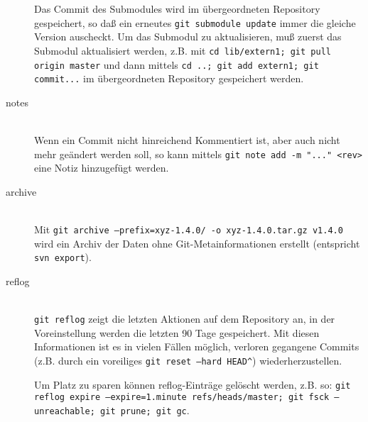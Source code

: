 \documentclass[a4paper, 12pt]{article}
\begin{document}
\begin{description}
  Das Commit des Submodules wird im übergeordneten Repository gespeichert, so daß ein erneutes \texttt{git submodule update} immer die gleiche Version auscheckt. Um das Submodul zu aktualisieren, muß zuerst das Submodul aktualisiert werden, z.B. mit \texttt{cd lib/extern1; git pull origin master} und dann mittels \texttt{cd ..; git add extern1; git commit...} im übergeordneten Repository gespeichert werden.
	
  \item[notes] \hfill \\
  Wenn ein Commit nicht hinreichend Kommentiert ist, aber auch nicht mehr geändert werden soll, so kann mittels \texttt{git note add -m }\verb|"|\texttt{...}\verb|"|\texttt{ <rev>} eine Notiz hinzugefügt werden.
  
  \item[archive] \hfill \\
  Mit \texttt{git archive --prefix=xyz-1.4.0/ -o xyz-1.4.0.tar.gz v1.4.0} wird ein Archiv der Daten ohne Git-Metainformationen erstellt (entspricht \texttt{svn export}).
  
  \item[reflog] \hfill \\
  \texttt{git reflog} zeigt die letzten Aktionen auf dem Repository an, in der Voreinstellung werden die letzten 90 Tage gespeichert. Mit diesen Informationen ist es in vielen Fällen möglich, verloren gegangene Commits (z.B. durch ein voreiliges \texttt{git reset --hard HEAD}\verb|^|) wiederherzustellen.

  Um Platz zu sparen können reflog-Einträge gelöscht werden, z.B. so: \texttt{git reflog expire --expire=1.minute refs/heads/master; git fsck --unreachable; git prune; git gc}.
  
  
  
\end{description}
\end{document}
